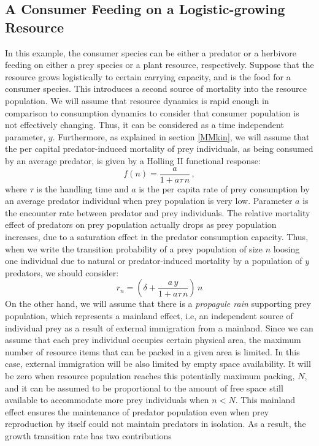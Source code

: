 \subsection{A Consumer Feeding on a Logistic-growing Resource}
In this example, the consumer species can be either a predator or a herbivore feeding on either a prey species or a plant resource, respectively. Suppose that the resource grows logistically to certain carrying capacity, and is the food for a consumer species. This introduces a second source of mortality into the resource population. We will assume that resource dynamics is rapid enough in comparison to consumption dynamics to consider that consumer population is not effectively changing. Thus, it can be considered as a time independent parameter, $y$. Furthermore, as explained in section \ref{MMkin}, we will assume that the per capital predator-induced mortality of prey individuals, as being consumed by an average predator, is given by a Holling II functional response:
\begin{equation}
f(n) = \frac{a}{1+a\tau\,n}\,,
\end{equation}
where $\tau$ is the handling time and $a$ is the per capita rate of prey consumption by an average predator individual when prey population is very low. Parameter $a$ is the encounter rate between predator and prey individuals. The relative mortality effect of predators on prey population actually drops as prey population increases, due to a saturation effect in the predator consumption capacity. Thus, when we write the transition probability of a prey population of size $n$ loosing one individual due to natural or predator-induced mortality by a population of $y$ predators, we should consider:
\begin{equation}
\label{r_2}
r_{n}  =  \left(\delta + \frac{a\,y}{1+a\tau\,n}\right)\,n 
\end{equation}
On the other hand, we will assume that there is a {\em  propagule rain} \citep{Gotelli93} supporting prey population, which represents a mainland effect, i.e, an independent source of individual prey as a result of external immigration from a mainland. Since we can assume that each prey individual occupies certain physical area, the maximum number of resource items that can be packed in a given area is limited. In this case, external immigration will be also limited by empty space availability. It will be zero when resource population reaches this potentially maximum packing, $N$, and it can be assumed to be proportional to the amount of free space still available to accommodate more prey individuals when $n < N$. This mainland effect ensures the maintenance of predator population even when prey reproduction by itself could not maintain predators in isolation. As a result, the growth transition rate has two contributions
